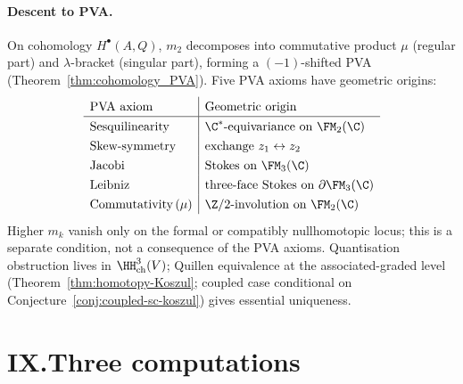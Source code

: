 \paragraph{Descent to PVA.}
On cohomology $H^\bullet(A, Q)$, $m_2$ decomposes into
commutative product $\mu$ (regular part) and
$\lambda$-bracket (singular part), forming a $(-1)$-shifted PVA
(Theorem~\ref{thm:cohomology_PVA}). Five PVA axioms have
geometric origins:
\[
\renewcommand{\arraystretch}{1.3}
\begin{array}{l|l}
\text{PVA axiom} & \text{Geometric origin} \\
\hline
\text{Sesquilinearity} & \C^*\text{-equivariance on } \FM_2(\C) \\
\text{Skew-symmetry} & \text{exchange } z_1 \leftrightarrow z_2 \\
\text{Jacobi} & \text{Stokes on } \FM_3(\C) \\
\text{Leibniz} & \text{three-face Stokes on } \partial\FM_3(\C) \\
\text{Commutativity}\,(\mu) & \Z/2\text{-involution on } \FM_2(\C)
\end{array}
\]
Higher $m_k$ vanish only on the formal or compatibly nullhomotopic
locus; this is a separate condition, not a consequence of the PVA
axioms.
Quantisation obstruction lives in $\HH^3_{\mathrm{ch}}(V)$;
Quillen equivalence at the associated-graded level
(Theorem~\ref{thm:homotopy-Koszul}; coupled case conditional on
Conjecture~\ref{conj:coupled-sc-koszul}) gives
essential uniqueness.

\section*{IX.\quad Three computations}

